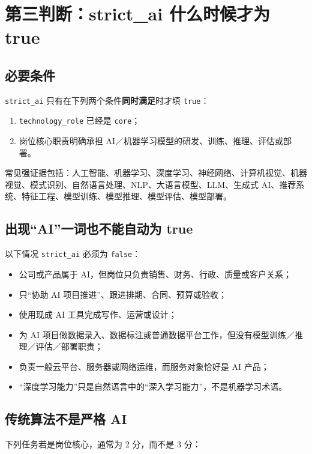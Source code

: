 \documentclass[11pt,a4paper,fontset=none]{ctexart}
\newcommand{\field}[1]{\nolinkurl{#1}}
\begin{document}
\section{第三判断：strict\_ai 什么时候才为 true}

\subsection{必要条件}

\field{strict_ai} 只有在下列两个条件\textbf{同时满足}时才填 \texttt{true}：

\begin{enumerate}
  \item \field{technology_role} 已经是 \texttt{core}；
  \item 岗位核心职责明确承担 AI／机器学习模型的研发、训练、推理、评估或部署。
\end{enumerate}

常见强证据包括：人工智能、机器学习、深度学习、神经网络、计算机视觉、机器视觉、模式识别、自然语言处理、NLP、大语言模型、LLM、生成式 AI、推荐系统、特征工程、模型训练、模型推理、模型评估、模型部署。

\subsection{出现“AI”一词也不能自动为 true}

以下情况 \field{strict_ai} 必须为 \texttt{false}：

\begin{itemize}
  \item 公司或产品属于 AI，但岗位只负责销售、财务、行政、质量或客户关系；
  \item 只“协助 AI 项目推进”、跟进排期、合同、预算或验收；
  \item 使用现成 AI 工具完成写作、运营或设计；
  \item 为 AI 项目做数据录入、数据标注或普通数据平台工作，但没有模型训练／推理／评估／部署职责；
  \item 负责一般云平台、服务器或网络运维，而服务对象恰好是 AI 产品；
  \item “深度学习能力”只是自然语言中的“深入学习能力”，不是机器学习术语。
\end{itemize}

\subsection{传统算法不是严格 AI}

下列任务若是岗位核心，通常为 2 分，而不是 3 分：
\end{document}
